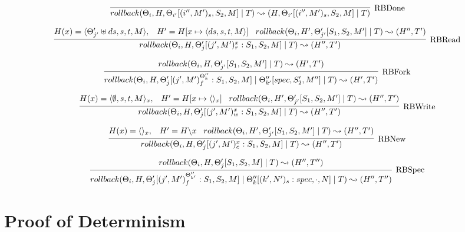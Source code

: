 \documentclass[9pt]{article}
\begin{document}
\[%
\infer[\text{RBDone}]{rollback(\Theta_i, H, \Theta_{i'}[(i'', M')_s, S_2, M] \; | \; T) \leadsto (H, \Theta_{i'}[(i'', M')_s, S_2, M] \; | \; T)}{}
\]

\[%
\infer[\text{RBRead}]{rollback(\Theta_i, H, \Theta_j'[(j', M')_r^x : S_1, S_2, M] \; | \; T) \leadsto (H'', T')}{H(x) = \langle \Theta_{j'}' \uplus ds, s, t, M\rangle, \;\;\; H' = H[x \mapsto \langle ds, s, t, M\rangle] \;\;\; rollback(\Theta_i, H', \Theta_{j'}'[S_1, S_2, M'] \; | \; T) \leadsto (H'', T')}
\]

\[%
\infer[\text{RBFork}]{rollback(\Theta_i, H, \Theta_j'[(j', M')_f^{\Theta_k''} : S_1, S_2, M] \; | \; \Theta_{k'}''[spec, S_2', M''] \; | \; T) \leadsto (H', T')}{rollback(\Theta_i, H, \Theta_{j'}'[S_1, S_2, M'] \; | \; T) \leadsto (H', T')}
\]

\[%
\infer[\text{RBWrite}]{rollback(\Theta_i, H, \Theta_j'[(j', M')_w^x : S_1, S_2, M] \; | \; T) \leadsto (H'', T')}{H(x) = \langle \emptyset, s, t, M\rangle_x, \;\;\; H' = H[x \mapsto \langle\rangle_x] \;\;\; rollback(\Theta_i, H', \Theta_{j'}'[S_1, S_2, M'] \; | \; T) \leadsto (H'', T')}
\]

\[%
\infer[\text{RBNew}]{rollback(\Theta_i, H, \Theta_j'[(j', M')_c^x : S_1, S_2, M] \; | \; T) \leadsto (H'', T')}{H(x) = \langle\rangle_x, \;\;\; H' = H \backslash x \;\;\; rollback(\Theta_i, H', \Theta_{j'}'[S_1, S_2, M'] \; | \; T) \leadsto (H'', T')}
\]

\[%
\infer[\text{RBSpec}]{rollback(\Theta_i, H, \Theta_j'[(j', M')_f^{\Theta_{k'}''} : S_1, S_2, M] \; | \; \Theta_k''[(k', N')_s : spec, \cdot, N] \; | \; T) \leadsto (H'', T'')}{rollback(\Theta_i, H, \Theta_j'[S_1, S_2, M] \; | \; T) \leadsto (H'', T'')}
\]

\section{Proof of Determinism}
\end{document}
